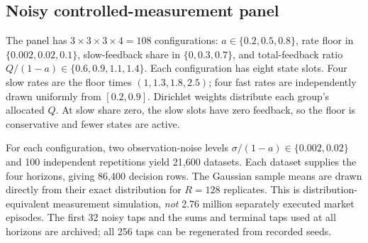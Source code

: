 \documentclass[11pt]{article}
\theoremstyle{remark}\newtheorem{remark}[theorem]{Remark}
\begin{document}
\subsection{Noisy controlled-measurement panel}
The panel has $3\times3\times3\times4=108$ configurations: $a\in\{0.2,0.5,0.8\}$, rate floor in $\{0.002,0.02,0.1\}$, slow-feedback share in $\{0,0.3,0.7\}$, and total-feedback ratio $Q/(1-a)\in\{0.6,0.9,1.1,1.4\}$. Each configuration has eight state slots. Four slow rates are the floor times $(1,1.3,1.8,2.5)$; four fast rates are independently drawn uniformly from $[0.2,0.9]$. Dirichlet weights distribute each group's allocated $Q$. At slow share zero, the slow slots have zero feedback, so the floor is conservative and fewer states are active.

For each configuration, two observation-noise levels $\sigma/(1-a)\in\{0.002,0.02\}$ and 100 independent repetitions yield 21,600 datasets. Each dataset supplies the four horizons, giving 86,400 decision rows. The Gaussian sample means are drawn directly from their exact distribution for $R=128$ replicates. This is distribution-equivalent measurement simulation, \emph{not} 2.76 million separately executed market episodes. The first 32 noisy taps and the sums and terminal taps used at all horizons are archived; all 256 taps can be regenerated from recorded seeds.
\end{document}
